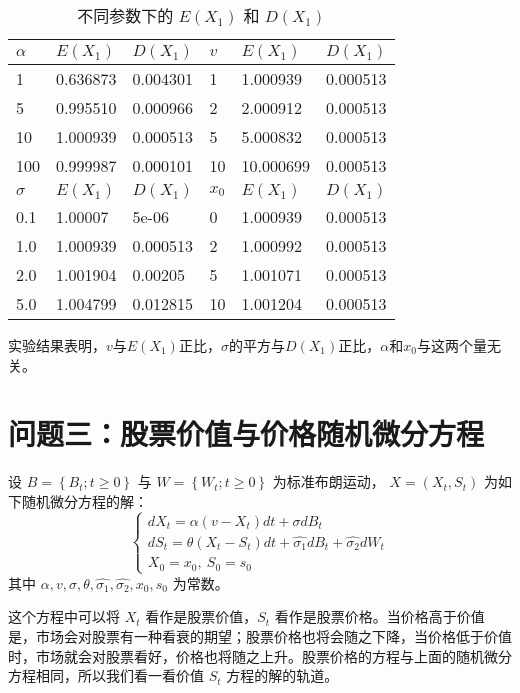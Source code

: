 \documentclass{article}
\begin{document}
\begin{table}[H]
    \centering
    \caption{不同参数下的 $E(X_1)$ 和 $D(X_1)$}
    \begin{tabular}{l|l|l|l|l|l}
    \hline
    $\alpha$ & $E(X_1)$ & $D(X_1)$ & $v$    & $E(X_1)$ & $D(X_1)$ \\ \hline
    1     & 0.636873 & 0.004301 & 1    & 1.000939  & 0.000513 \\
    5     & 0.995510 & 0.000966 & 2    & 2.000912  & 0.000513 \\
    10     & 1.000939  & 0.000513 & 5    & 5.000832  & 0.000513 \\
    100    & 0.999987 & 0.000101 & 10   & 10.000699 & 0.000513 \\ \hline 
    $\sigma$ & $E(X_1)$ & $D(X_1)$ & $x_0$ & $E(X_1)$ & $D(X_1)$ \\ \hline
    0.1   & 1.00007  & 5e-06    & 0    & 1.000939  & 0.000513 \\
    1.0   & 1.000939 & 0.000513 & 2    & 1.000992  & 0.000513 \\
    2.0   & 1.001904 & 0.00205  & 5    & 1.001071  & 0.000513 \\
    5.0   & 1.004799 & 0.012815 & 10   & 1.001204  & 0.000513 \\ \hline
    \end{tabular}
\end{table}


    
实验结果表明，$v$与$E(X_1)$正比，$\sigma$的平方与$D(X_1)$正比，$\alpha$和$x_0$与这两个量无关。




\section{问题三：股票价值与价格随机微分方程}
设 $B=\left\{B_{t} ; t \geq 0\right\}$ 与 $W=\left\{W_{t} ; t \geq 0\right\}$ 为标准布朗运动， $X=\left(X_{t} , S_t\right)$ 为如下随机微分方程的解：
$$
\left\{\begin{array}{l}
d X_{t}=\alpha\left(v-X_{t}\right) d t+\sigma d B_{t} \\
d S_{t} = \theta \left(X_{t}-S_{t}\right) d t+\hat{\sigma_1} dB_t + \hat{\sigma_2} dW_t\\
X_{0}=x_{0}, \ S_0 = s_0
\end{array}\right.
$$
其中 $\alpha, v, \sigma, \theta, \hat{\sigma_1}, \hat{\sigma_2}, x_{0}, s_0$ 为常数。

这个方程中可以将 $X_t$ 看作是股票价值，$S_t$ 看作是股票价格。当价格高于价值是，市场会对股票有一种看衰的期望；股票价格也将会随之下降，当价格低于价值时，市场就会对股票看好，价格也将随之上升。股票价格的方程与上面的随机微分方程相同，所以我们看一看价值 $S_t$ 方程的解的轨道。
\end{document}
